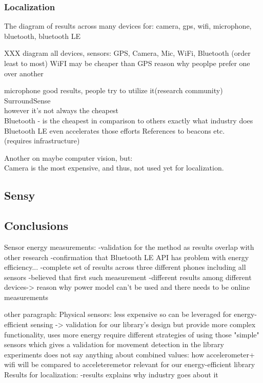 		
\subsubsection{Localization}

The diagram of results across many devices for: camera, gps, wifi, microphone, bluetooth, bluetooth LE


XXX diagram all devices, sensors: GPS, Camera, Mic, WiFi, Bluetooth (order least to most)
WiFI may be cheaper than GPS
	reason why peoplpe prefer one over another				
				
microphone good results, people try to utilize it(research community)\\
				SurroundSense \cite{azizyan:surroundsense}\\
				however it's not always the cheapest\\
	
Bluetooth - is the cheapest in comparison to others
				exactly what industry does\\
				Bluetooth LE even accelerates those efforts
				References to beacons etc.\\
				(requires infrastructure)
				
Another on maybe computer vision, but:				\\
	Camera is the most expensive, and thus, not used yet for localization.\\
	
			
								
\subsection{Sensy}
\subsection{Conclusions}
Sensor energy measurements:
	-validation for the method
			as results overlap with other research
	-confirmation that Bluetooth LE API has problem with energy efficiency...
	-complete set of results across three different phones including all sensors
		-believed that first such measurement
	-different results among different devices-> reason why power model can't be used and there needs to be online measurements

other paragraph:
	Physical sensors:
		less expensive so can be leveraged for energy-efficient sensing
			-> validation for our library's design
		but provide more complex functionality, uses more energy
			require different strategies of using those "simple" sensors
				which gives a validation for movement detection in the library
		experiments does not say anything about combined values:
			how accelerometer+ wifi will be compared to acceleteremetor
				relevant for our energy-efficient library
	Results for localization: 
		-results explains why industry goes about it